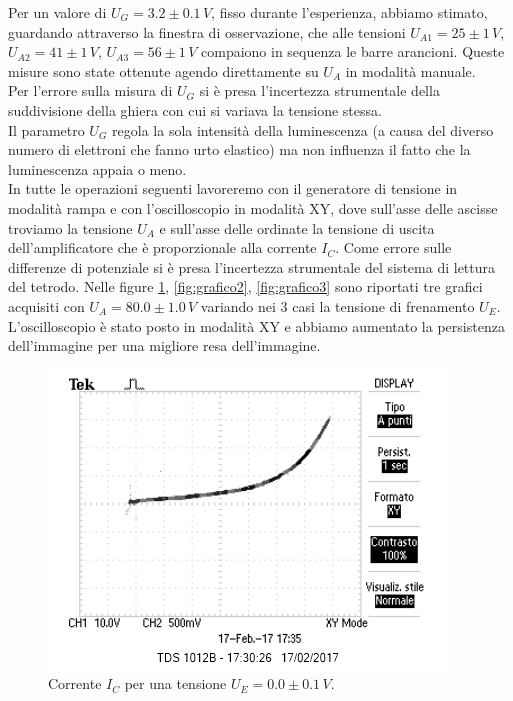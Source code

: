 \documentclass[10pt,a4paper]{article}
\begin{document}
Per un valore di $U_G = 3.2 \pm 0.1 \, V $, fisso durante l'esperienza, abbiamo stimato, guardando attraverso la finestra di osservazione, che alle tensioni $U_{A1} = 25 \pm 1 \, V$, $U_{A2} = 41 \pm 1 \, V$, $U_{A3} = 56 \pm 1 \, V$ compaiono in sequenza le barre arancioni. Queste misure sono state ottenute agendo direttamente su $U_A$ in modalità manuale.\\
Per l'errore sulla misura di $U_G$ si è presa l'incertezza strumentale della suddivisione della ghiera con cui si variava la tensione stessa.\\ 
Il parametro $U_G$ regola la sola intensità della luminescenza (a causa del diverso numero di elettroni che fanno urto elastico) ma non influenza il fatto che la luminescenza appaia o meno.\\
In tutte le operazioni seguenti lavoreremo con il generatore di tensione in modalità rampa e con l'oscilloscopio in modalità XY, dove sull'asse delle ascisse troviamo la tensione $U_A$ e sull'asse delle ordinate la tensione di uscita dell'amplificatore che è proporzionale alla corrente $I_C$. Come errore sulle differenze di potenziale si è presa l'incertezza strumentale del sistema di lettura del tetrodo.
Nelle figure \ref{fig:grafico1}, \ref{fig:grafico2}, \ref{fig:grafico3} sono riportati tre grafici acquisiti con $U_A = 80.0\pm1.0 \, V$ variando nei 3 casi la tensione di frenamento $U_E$. L'oscilloscopio è stato posto in modalità XY e abbiamo aumentato la persistenza dell'immagine per una migliore resa dell'immagine.\\


\begin{figure}[!htb]
  \centering
  \includegraphics[scale=1.0]{uezero.png}
\caption{Corrente $I_C$ per una tensione $U_E = 0.0\pm0.1 \, V$.\label{fig:grafico1}}

\end{figure}
\end{document}
